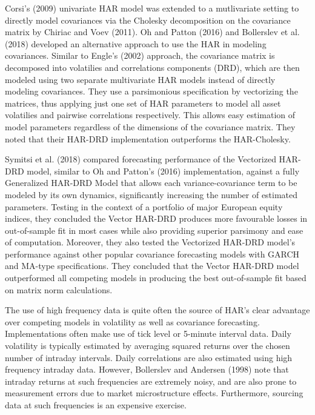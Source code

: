 \documentclass{article}
\begin{document}
Corsi's (2009) univariate HAR model was extended to a 
mutlivariate setting to directly model covariances via the 
Cholesky decomposition on the covariance matrix by 
Chiriac and Voev (2011)\cite{Chiriac2011}. Oh and Patton (2016)\cite{OhPatton2016} and 
Bollerslev et al. (2018)\cite{Bollerslev2018} developed an alternative approach
to use the HAR in modeling covariances. Similar to 
Engle's (2002) approach, the covariance matrix is 
decomposed into volatilies and correlations components 
(DRD), which are then modeled using two separate 
multivariate HAR models instead of directly modeling covariances. 
They use a parsimonious specification by vectorizing the matrices,
thus applying just one set of HAR parameters to model all asset volatilies
and pairwise correlations respectively. This allows easy estimation of model
parameters regardless of the dimensions of the covariance matrix.   
They noted that their HAR-DRD implementation outperforms the HAR-Cholesky.

Symitsi et al. (2018)\cite{Symitsi2018} compared forecasting performance of the
Vectorized HAR-DRD model, similar to Oh and Patton's (2016) implementation,
against a fully Generalized HAR-DRD Model that allows each variance-covariance term
to be modeled by its own dynamics, significantly increasing the number of estimated parameters. Testing in the context of a portfolio of 
major European equity indices, they concluded the Vector HAR-DRD produces more favourable 
losses in out-of-sample fit in most cases while also providing superior parsimony and 
ease of computation.  Moreover, they also tested the Vectorized HAR-DRD model's performance against
other popular covariance forecasting models with GARCH and MA-type specifications. 
They concluded that the Vector HAR-DRD model outperformed all 
competing models in producing the best out-of-sample fit based on matrix norm calculations.

The use of high frequency data is quite often the source of HAR's clear advantage over
competing models in volatility as well as covariance forecasting. Implementations often make use of tick level or 5-minute interval data.
Daily volatility is typically estimated by averaging squared returns over the chosen number of 
intraday intervals. Daily correlations are also estimated using high frequency intraday data. 
However, Bollerslev and Andersen (1998)\cite{Bollerslev1998} note that intraday returns at such frequencies are extremely noisy, and are 
also prone to measurement errors due to market microstructure
effects. Furthermore, sourcing data at such frequencies is an expensive exercise.
\end{document}
